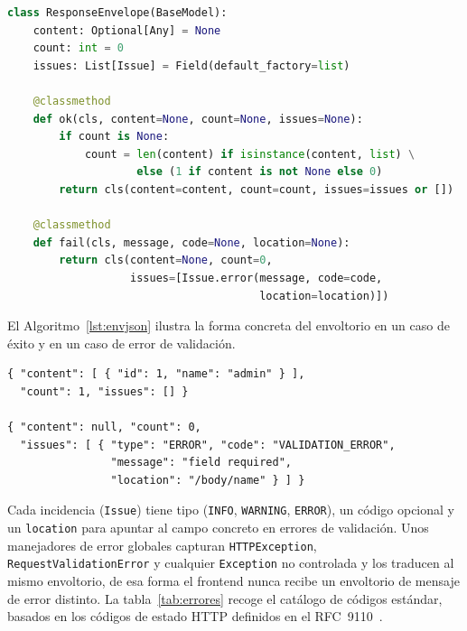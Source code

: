 \begin{lstlisting}[language=Python, caption={Envoltorio de respuesta normalizado (\texttt{responses.py})}, label={lst:envelope}]
class ResponseEnvelope(BaseModel):
    content: Optional[Any] = None
    count: int = 0
    issues: List[Issue] = Field(default_factory=list)

    @classmethod
    def ok(cls, content=None, count=None, issues=None):
        if count is None:
            count = len(content) if isinstance(content, list) \
                    else (1 if content is not None else 0)
        return cls(content=content, count=count, issues=issues or [])

    @classmethod
    def fail(cls, message, code=None, location=None):
        return cls(content=None, count=0,
                   issues=[Issue.error(message, code=code,
                                       location=location)])
\end{lstlisting}

El Algoritmo~\ref{lst:envjson} ilustra la forma concreta del envoltorio en un
caso de éxito y en un caso de error de validación.

\begin{lstlisting}[style=docker, caption={Envoltorio en éxito (arriba) y en error de validación (abajo)}, label={lst:envjson}]
{ "content": [ { "id": 1, "name": "admin" } ],
  "count": 1, "issues": [] }

{ "content": null, "count": 0,
  "issues": [ { "type": "ERROR", "code": "VALIDATION_ERROR",
                "message": "field required",
                "location": "/body/name" } ] }
\end{lstlisting}

Cada incidencia (\texttt{Issue}) tiene tipo (\texttt{INFO}, \texttt{WARNING},
\texttt{ERROR}), un código opcional y un \texttt{location} para apuntar al
campo concreto en errores de validación. Unos manejadores de error globales
capturan \texttt{HTTPException}, \texttt{RequestValidationError} y cualquier
\texttt{Exception} no controlada y los traducen al mismo envoltorio, de esa forma
 el frontend nunca recibe un envoltorio de mensaje de error distinto. La
tabla~\ref{tab:errores} recoge el catálogo de códigos estándar, basados en los
códigos de estado HTTP definidos en el RFC~9110~\cite{rfc9110}.


